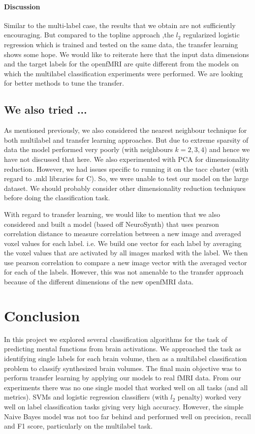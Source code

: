 \documentclass{article} %
\begin{document}
\paragraph{Discussion}
Similar to the multi-label case, the results that we obtain are not sufficiently encouraging. But compared to the topline approach ,the $l_2$ regularized logistic regression which is trained and tested on the same data, the transfer learning shows some hope. We would like to reiterate here that the input data dimensions and the target labels for the openfMRI are quite different from the models on which the multilabel classification experiments were performed. We are looking for better methods to tune the transfer.

\subsection{We also tried ...}
As mentioned previously, we also considered the nearest neighbour technique for both multilabel and transfer learning approaches. But due to extreme sparsity of data the model performed very poorly (with neighbours $k=2,3,4$) and hence we have not discussed that here. We also experimented with PCA for dimensionality reduction. However, we had issues specific to running it on the tacc cluster (with regard to .mkl libraries for C). So, we were unable to test our model on the large dataset. We should probably consider other dimensionality reduction techniques before doing the classification task.

With regard to transfer learning, we would like to mention that we also considered and built a model (based off NeuroSynth) that uses pearson correlation distance to measure correlation between a new image and averaged voxel values for each label. i.e. We build one vector for each label by averaging the voxel values that are activated by all images marked with the label. We then use pearson correlation to compare a new image vector with the averaged vector for each of the labels. However, this was not amenable to the transfer approach because of the different dimensions of the new openfMRI data. 

\section{Conclusion}
In this project we explored several classification algorithms for the task of predicting mental functions from brain activations. We approached the task as identifying single labels for each brain volume, then as a multilabel classification problem to classify synthesized brain volumes. The final main objective was to perform transfer learning by applying our models to real fMRI data. From our experiments there was no one single model that worked well on all tasks (and all metrics). SVMs and logistic regression classifiers (with $l_2$ penalty) worked very well on label classification tasks giving very high accuracy. However, the simple Naive Bayes model was not too far behind and performed well on precision, recall and F1 score, particularly on the multilabel task.
\end{document}
